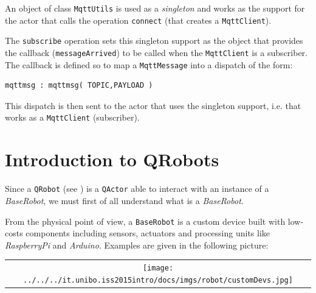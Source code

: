 

An object of class \texttt{MqttUtils} is used as a \textit{singleton} and works as the support for the actor that calls the operation \texttt{connect} (that creates a \texttt{MqttClient}).

The \texttt{subscribe} operation sets this singleton support as the object that provides the callback (\texttt{messageArrived}) to be called when the \texttt{MqttClient} is a subscriber. The callback is defined so to map a \texttt{MqttMessage} into a dispatch of the form:

\begin{Verbatim}[fontsize=\scriptsize, frame=single]
mqttmsg : mqttmsg( TOPIC,PAYLOAD )
\end{Verbatim}

This dispatch is then sent to the actor that uses the singleton support, i.e. that works as a \texttt{MqttClient} (subscriber).


 
 
\newpage
\section{Introduction to QRobots}
 
Since a \texttt{QRobot} (see  ) is a \texttt{QActor} able to interact with an instance of a \textit{BaseRobot}, we must first of all understand what is a \textit{BaseRobot}.


\medskip 
From the physical point of view, a \texttt{BaseRobot} is a custom device built with low-costs components including sensors, actuators and processing units like \textit{RaspberryPi} and \textit{Arduino}. Examples are given in the following picture:

\begin{center}
\begin{tabular}{ c }
     \texttt{[image: ../../../it.unibo.iss2015intro/docs/imgs/robot/customDevs.jpg]}\\
\end{tabular} 
\end{center}


